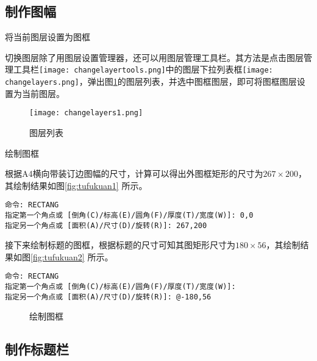 \subsection{制作图幅}
\begin{procedure}
\item 将当前图层设置为图框

切换图层除了用图层设置管理器，还可以用图层管理工具栏。其方法是点击图层管理工具栏\texttt{[image: changelayertools.png]}中的图层下拉列表框\texttt{[image: changelayers.png]}，弹出图\ref{fig:changelayers1}的图层列表，并选中图框图层，即可将图框图层设置为当前图层。
\begin{figure}[htbp]
\centering
\texttt{[image: changelayers1.png]}
\caption{图层列表}\label{fig:changelayers1}
\end{figure}
\item 绘制图框

根据A4横向带装订边图幅的尺寸，计算可以得出外图框矩形的尺寸为$267\times 200$，其绘制结果如图\ref{fig:tufukuan1} 所示。
\begin{lstlisting}
命令: RECTANG
指定第一个角点或 [倒角(C)/标高(E)/圆角(F)/厚度(T)/宽度(W)]: 0,0
指定另一个角点或 [面积(A)/尺寸(D)/旋转(R)]: 267,200
\end{lstlisting}

接下来绘制标题的图框，根据标题的尺寸可知其图矩形尺寸为$180\times 56$，其绘制结果如图\ref{fig:tufukuan2} 所示。
\begin{lstlisting}
命令: RECTANG
指定第一个角点或 [倒角(C)/标高(E)/圆角(F)/厚度(T)/宽度(W)]:
指定另一个角点或 [面积(A)/尺寸(D)/旋转(R)]: @-180,56
\end{lstlisting}
\begin{figure}[htbp]
\hspace{20pt}
\caption{绘制图框}
\end{figure}
\end{procedure}
\subsection{制作标题栏}


